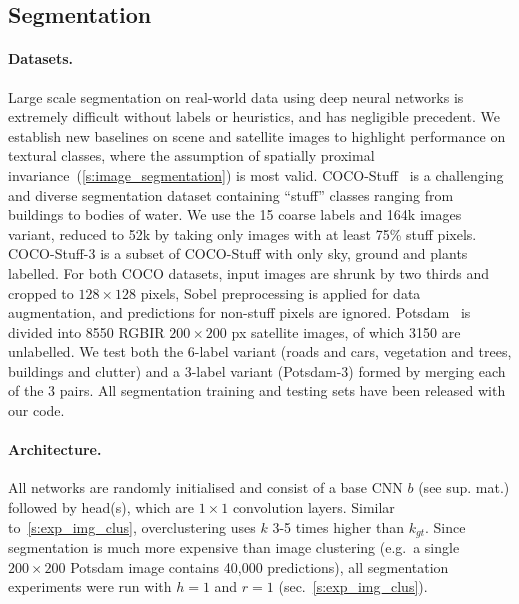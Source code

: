 \subsection{Segmentation}


%
%

%
%
%

\paragraph{Datasets.}
Large scale segmentation on real-world data using deep neural networks is extremely difficult without labels or heuristics, and has negligible precedent.
We establish new baselines on scene and satellite images to highlight performance on textural classes, where the assumption of spatially proximal invariance~(\cref{s:image_segmentation}) is most valid.
COCO-Stuff~\cite{caesar2016coco} is a challenging and diverse segmentation dataset containing ``stuff'' classes ranging from buildings to bodies of water.
We use the 15 coarse labels and 164k images variant, reduced to 52k by taking only images with at least 75\% stuff pixels.
COCO-Stuff-3 is a subset of COCO-Stuff with only sky, ground and plants labelled.
For both COCO datasets, input images are shrunk by two thirds and cropped to $128\times128$ pixels, Sobel preprocessing is applied for data augmentation, and predictions for non-stuff pixels are ignored.
Potsdam~\cite{potsdam} is divided into 8550 RGBIR $200\times200$ px satellite images, of which 3150 are unlabelled.
We test both the 6-label variant (roads and cars, vegetation and trees, buildings and clutter) and a 3-label variant (Potsdam-3) formed by merging each of the 3 pairs.
All segmentation training and testing sets have been released with our code.



\paragraph{Architecture.}
All networks are randomly initialised and consist of a base CNN $b$ (see sup. mat.) followed by head{}(s), which are $1\times1$ convolution layers.
Similar to~\cref{s:exp_img_clus}, overclustering uses $k$ 3-5 times higher than $k_{gt}$.
Since segmentation is much more expensive than image clustering (e.g.\ a single $200\times200$ Potsdam image contains 40,000 predictions), all segmentation experiments were run with $h = 1$ and $r = 1$ (sec.~\ref{s:exp_img_clus}).


